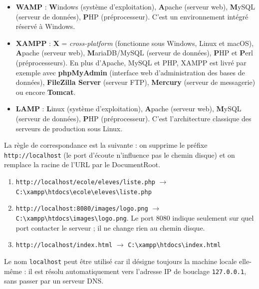 \documentclass[11pt]{article}
\newcommand{\cle}[1]{{\popxbold\color{popdark}#1}}
\begin{document}
\begin{corrige}
\begin{itemize}
\item \textbf{\cle{WAMP}} : \textbf{W}indows (système d'exploitation), \textbf{A}pache (serveur web), \textbf{M}ySQL (serveur de données), \textbf{P}HP (préprocesseur). C'est un \cle{environnement intégré} réservé à Windows.
\item \textbf{\cle{XAMPP}} : \textbf{X} = \emph{cross-platform} (fonctionne sous Windows, Linux et macOS), \textbf{A}pache (serveur web), \textbf{M}ariaDB/MySQL (serveur de données), \textbf{P}HP et \textbf{P}erl (préprocesseurs). En plus d'Apache, MySQL et PHP, XAMPP est livré par exemple avec \textbf{phpMyAdmin} (interface web d'administration des bases de données), \textbf{FileZilla Server} (serveur FTP), \textbf{Mercury} (serveur de messagerie) ou encore \textbf{Tomcat}.
\item \textbf{\cle{LAMP}} : \textbf{L}inux (système d'exploitation), \textbf{A}pache (serveur web), \textbf{M}ySQL (serveur de données), \textbf{P}HP (préprocesseur). C'est l'architecture classique des serveurs de production sous Linux.
\end{itemize}
\end{corrige}

\begin{corrige}
La règle de correspondance est la suivante : on supprime le préfixe \texttt{http://localhost} (le \cle{port d'écoute} n'influence pas le chemin disque) et on remplace la racine de l'URL par le \cle{DocumentRoot}.
\begin{enumerate}
\item \texttt{http://localhost/ecole/eleves/liste.php} $\rightarrow$ \texttt{C:\textbackslash xampp\textbackslash htdocs\textbackslash ecole\textbackslash eleves\textbackslash liste.php}
\item \texttt{http://localhost:8080/images/logo.png} $\rightarrow$ \texttt{C:\textbackslash xampp\textbackslash htdocs\textbackslash images\textbackslash logo.png}. Le port 8080 indique seulement sur quel port contacter le serveur ; il ne change rien au chemin disque.
\item \texttt{http://localhost/index.html} $\rightarrow$ \texttt{C:\textbackslash xampp\textbackslash htdocs\textbackslash index.html}
\end{enumerate}
Le nom \texttt{localhost} peut être utilisé car il désigne toujours la machine locale elle-même : il est résolu automatiquement vers l'adresse IP de bouclage \texttt{127.0.0.1}, sans passer par un serveur DNS.
\end{corrige}
\end{document}
